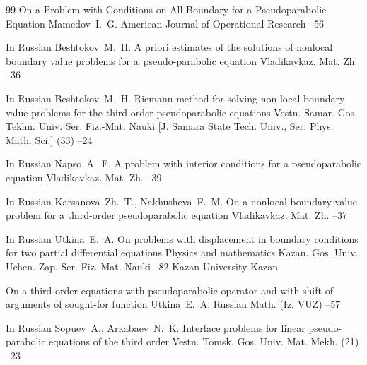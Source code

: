 \begin{thebibliography}{99}
\paper On a Problem with Conditions on All Boundary for a Pseudoparabolic Equation
\by Mamedov~I.~G.
\jour American Journal of Operational Research
--56


\lang In Russian
\by Beshtokov~M.~H.
\paper A priori estimates of the solutions of nonlocal boundary value problems for a~pseudo-parabolic equation
\jour Vladikavkaz. Mat. Zh.
--36




\lang In Russian
\by Beshtokov~M.~H.
\paper Riemann method for solving non-local boundary value problems for the third order pseudoparabolic equations
\jour Vestn. Samar. Gos. Tekhn. Univ. Ser. Fiz.-Mat. Nauki \rm [J. Samara State Tech. Univ., Ser. Phys. Math. Sci.]
(33)
--24


\lang In Russian
\by Napso~A.~F.
\paper A problem with interior conditions for a pseudoparabolic equation
\jour Vladikavkaz. Mat. Zh.
--39


\lang In Russian
\by Karsanova~Zh.~T., Nakhusheva~F.~M.
\paper On a nonlocal boundary value problem for a third-order pseudoparabolic equation
\jour Vladikavkaz. Mat. Zh.
--37

\lang In Russian
\by Utkina~E.~A.
\paper On problems with displacement in boundary conditions for two partial differential equations
\inbook Physics and mathematics
\serial Kazan. Gos. Univ. Uchen. Zap. Ser. Fiz.-Mat. Nauki
--82
\publ Kazan University
\publaddr Kazan




\paper On a third order equations with pseudoparabolic operator and with shift of arguments of sought-for function
\by Utkina~E.~A.
\jour Russian Math. (Iz. VUZ)
--57



\lang In Russian
\by Sopuev~A., Arkabaev~N.~K.
\paper Interface problems for linear pseudo-parabolic equations of the third order
\jour Vestn. Tomsk. Gos. Univ. Mat. Mekh.
(21)
--23




\end{thebibliography}
